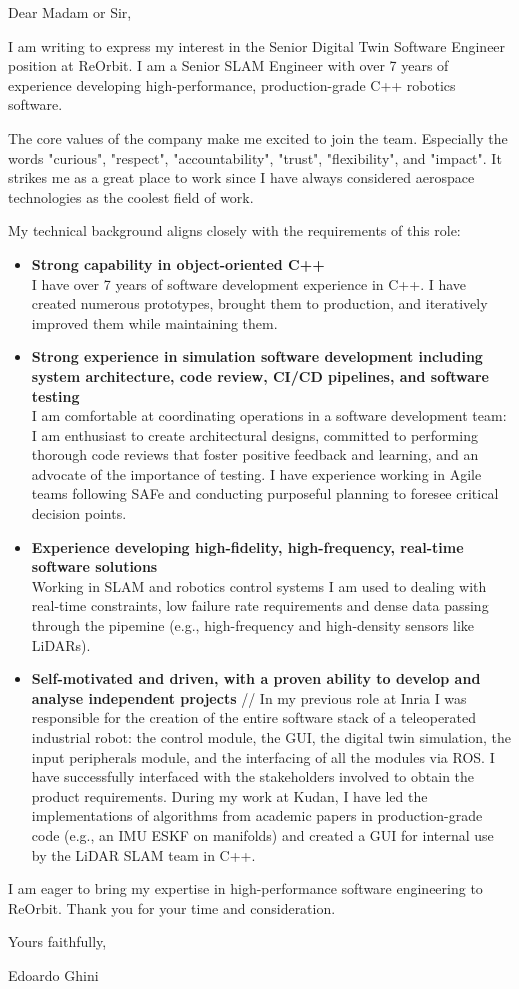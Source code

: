 



Dear Madam or Sir,
\medskip

I am writing to express my interest in the Senior Digital Twin Software
Engineer position at ReOrbit.
I am a Senior SLAM Engineer with over 7 years of experience developing
high-performance, production-grade C++ robotics software.

The core values of the company make me excited to join the team. Especially the
words "curious", "respect", "accountability", "trust", "flexibility", and
"impact".
It strikes me as a great place to work since I have always considered aerospace
technologies as the coolest field of work.
\medskip

My technical background aligns closely with the requirements of this role:
\begin{itemize}
\item
\textbf{ Strong capability in object-oriented C++}\\
    I have over 7 years of software development experience in C++. I have
    created numerous prototypes, brought them to production, and iteratively
    improved them while maintaining them.
\item
    \textbf{ Strong experience in simulation software development including
    system architecture, code review, CI/CD pipelines, and software testing} \\ 
    I am comfortable at coordinating operations in a software development team:
    I am enthusiast to create architectural designs, committed to performing
    thorough code reviews that foster positive feedback and learning, and an
    advocate of the importance of testing.
    I have experience working in Agile teams following SAFe and conducting
    purposeful planning to foresee critical decision points.
\item
  \textbf{ Experience developing high-fidelity, high-frequency, real-time
  software solutions} \\
   Working in SLAM and robotics control systems I am used to dealing with
   real-time constraints, low failure rate requirements and dense data passing
   through the pipemine (e.g., high-frequency and high-density sensors like
   LiDARs).
\item
 \textbf{ Self-motivated and driven, with a proven ability to develop and analyse
  independent projects} //
    In my previous role at Inria I was responsible for the creation of the
    entire software stack of a teleoperated industrial robot: the control
    module, the GUI, the digital twin simulation, the input peripherals
    module, and the interfacing of all the modules via ROS. 
    I have successfully interfaced with the stakeholders involved to obtain
    the product requirements.
    During my work at Kudan, I have led the implementations of algorithms from
    academic papers in production-grade code (e.g., an IMU ESKF on manifolds)
    and created a GUI for internal use by the LiDAR SLAM team in C++. 
\end{itemize}

\medskip

I am eager to bring my expertise in high-performance software engineering to
ReOrbit.
Thank you for your time and consideration.

\smallskip

Yours faithfully,

\medskip

Edoardo Ghini


